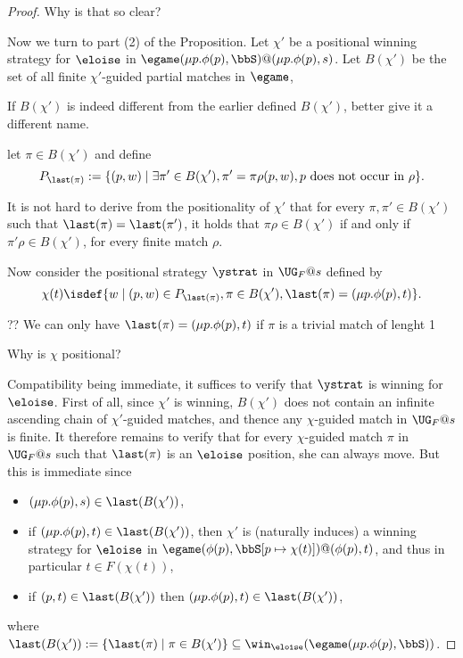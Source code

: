 \begin{proof}
\btbs
\item
Why is that so clear?
\etbs

\newpage

Now we turn to part (2) of the Proposition.
Let $\chi'$ be a positional winning strategy for $\eloise$ in 
$\egame(\mu p.\phi(p),\bbS)@(\mu p.\phi(p),s)$. 
Let $B(\chi')$ be the set of all finite $\chi'$-guided partial matches in 
$\egame$, 

\btbs
\item
If $B(\chi')$ is indeed different from the earlier defined $B(\chi')$, 
better give it a different name.
\etbs

let $\pi\in B(\chi')$ and define \[P_{\last(\pi)}:=\{ (p,w) \mid \exists \pi' \in B(\chi'), \pi'=\pi \rho(p,w), p\text{ does not occur in }\rho\}.\]

It is not hard to derive from the positionality of $\chi'$ that for every $\pi, 
\pi' \in B(\chi')$ such that $\last(\pi)=\last(\pi')$, it holds that $\pi\rho 
\in B(\chi')$ if and only if $\pi'\rho \in B(\chi')$, for every finite match 
$\rho$.

Now consider  the positional strategy $\ystrat$ in $\UG_{F}@s$ defined by 
\[
\chi(t) \isdef \{ w \mid (p,w) \in P_{\last(\pi)}, \pi\in B(\chi'), 
\last(\pi)=(\mu p. \phi(p), t)\}.
\]
\btbs
\item
?? We can only have $\last(\pi)=(\mu p. \phi(p), t)$ if $\pi$ is a trivial
match of lenght 1
\item
Why is $\chi$ positional?
\etbs


Compatibility being immediate, it suffices to verify that $\ystrat$ is winning for $\eloise$. First of all, since $\chi'$ is winning, $B(\chi')$ does not contain an infinite 
ascending chain of $\chi'$-guided matches, and thence any  $\chi$-guided match in $\UG_{F}@s$ is finite. It therefore remains to verify that for every $\chi$-guided match $\pi$ in $\UG_{F}@s$ such that $\last(\pi)$ is an $\eloise$ position, she can always move. But this is immediate since 
\begin{itemize}
\item $(\mu p. \phi(p), s) \in \last(B(\chi'))$, 
\item if $(\mu p. \phi(p), t) \in \last(B(\chi'))$, then %
$\chi'$ is (naturally induces) a winning strategy for $\eloise$ in $\egame(\phi(p),\bbS[p \mapsto \chi(t)])@(\phi(p),t)$, and thus in particular $t \in F(\chi(t))$,
\item if $(p, t) \in \last(B(\chi'))$ then $(\mu p. \phi(p), t) \in \last(B(\chi'))$,
\end{itemize}
where $\last(B(\chi')):=\{\last(\pi) \mid \pi \in B(\chi')\} \subseteq \win_{\eloise}(\egame(\mu p.\phi(p),\bbS))$.
\end{proof}

